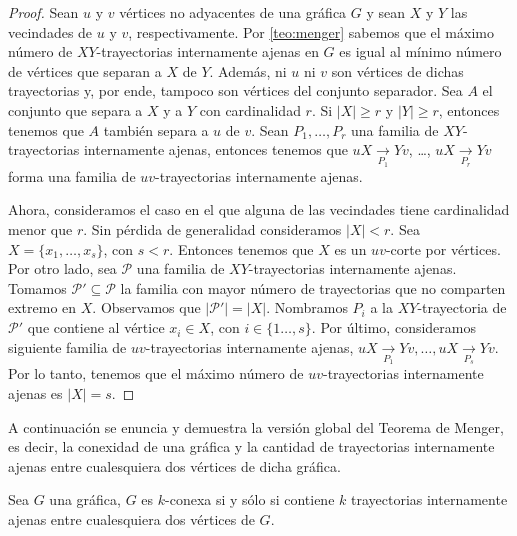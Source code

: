 \begin{proof}
    Sean $u$ y $v$ v\'ertices no adyacentes de una gr\'afica $G$ y sean $X$ y
    $Y$ las vecindades de $u$ y $v$, respectivamente. Por \cref{teo:menger}
    sabemos que el m\'aximo n\'umero de $XY$-trayectorias internamente ajenas en
    $G$ es igual al m\'inimo n\'umero de v\'ertices que separan a $X$ de $Y$.
    Adem\'as, ni $u$ ni $v$ son v\'ertices de dichas trayectorias y, por ende,
    tampoco son v\'ertices del conjunto separador. Sea  $A$ el conjunto que
    separa a $X$ y a $Y$ con cardinalidad $r$. Si $|X| \geq r$ y $|Y| \geq r$,
    entonces tenemos que $A$ tambi\'en separa a $u$ de $v$. Sean $P_1, \dots,
    P_r$ una familia de $XY$-trayectorias internamente ajenas, entonces tenemos
    que $uX\xrightarrow[P_1]{}Yv$, \dots, $uX\xrightarrow[P_r]{}Yv$ forma una
    familia de $uv$-trayectorias internamente ajenas. 

    Ahora, consideramos el caso en el que alguna de las vecindades tiene
    cardinalidad menor que $r$.  Sin p\'erdida de generalidad consideramos
    $|X|<r$. Sea $X = \{x_1, \dots, x_s\}$, con $s<r$. Entonces tenemos que $X$
    es un $uv$-corte por v\'ertices. Por otro lado, sea $\mathcal{P}$ una
    familia de $XY$-trayectorias internamente ajenas. Tomamos $\mathcal{P'}
    \subseteq \mathcal{P}$ la familia con mayor n\'umero de trayectorias que no
    comparten extremo en $X$. Observamos que $|\mathcal{P'}| = |X|$. Nombramos
    $P_i$ a la $XY$-trayectoria de $\mathcal{P'}$ que contiene al v\'ertice $x_i
    \in X$, con $i \in \{1 \dots, s\}$. Por \'ultimo, consideramos siguiente
    familia de $uv$-trayectorias internamente ajenas, $uX\xrightarrow[P_1]{}Yv,
    \dots, uX\xrightarrow[P_s]{}Yv$. Por lo tanto, tenemos que el m\'aximo
    n\'umero de $uv$-trayectorias internamente ajenas es $|X|=s$.
\end{proof}


A continuaci\'on  se enuncia y demuestra la versi\'on global del Teorema de
Menger, es decir, la conexidad de una gr\'afica y la cantidad de trayectorias
internamente ajenas entre cualesquiera dos v\'ertices de dicha gr\'afica.

\begin{teorema}
    \label{teo:mengerGen}
     Sea $G$ una gr\'afica, $G$ es $k$-conexa si y s\'olo si contiene
     $k$ trayectorias internamente ajenas entre cualesquiera dos v\'ertices de
     $G$.
 \end{teorema}

